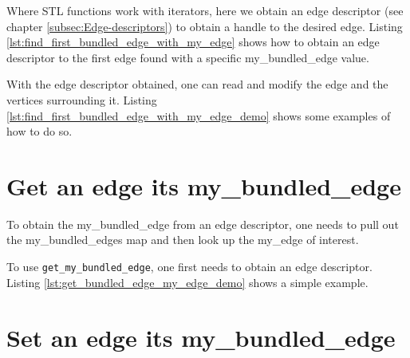 Where STL functions work with iterators, here we obtain an edge descriptor
(see chapter \ref{subsec:Edge-descriptors}) 
to obtain a handle to the desired edge.
Listing \ref{lst:find_first_bundled_edge_with_my_edge}
shows how to obtain an edge descriptor to the first edge found with a specific
my\_bundled\_edge value.



With the edge descriptor obtained, one can read and modify the edge and
the vertices surrounding it.
Listing \ref{lst:find_first_bundled_edge_with_my_edge_demo}
shows some examples of how to do so.



\section{Get an edge its my\_bundled\_edge}
\label{subsec:get_bundled_edge_my_edge}

To obtain the my\_bundled\_edge from an edge descriptor, one needs to pull
out the my\_bundled_edges map and then look up the my\_edge of interest.



To use \verb;get_my_bundled_edge;, 
one first needs to obtain an edge descriptor.
Listing \ref{lst:get_bundled_edge_my_edge_demo} shows a simple example.



\section{Set an edge its my\_bundled\_edge}
\label{subsec:set_bundled_edge_my_edge}

